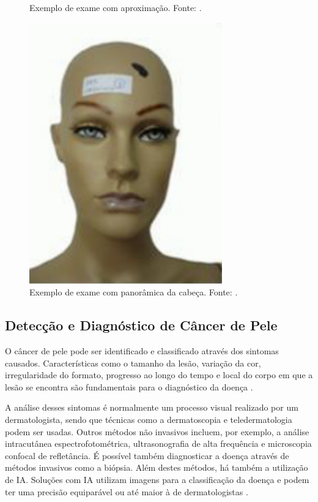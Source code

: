 \begin{figure}[ht]
\begin{minipage}{0.32\textwidth}
            \caption{\small Exemplo de exame com aproximação. Fonte: \textcite{fotos_dermatologia}.}
            \label{fig:approximation_pic}
      \end{minipage}\hfill
      \begin{minipage}{0.32\textwidth}
            \centering
            \includegraphics[height=0.8\columnwidth,keepaspectratio]{images/panoramic.png}
            \caption{\small Exemplo de exame com panorâmica da cabeça. Fonte: \textcite{fotos_dermatologia}.}
            \label{fig:panoramic_pic}
      \end{minipage}
\end{figure}

\subsection{Detecção e Diagnóstico de Câncer de Pele}

O câncer de pele pode ser identificado e classificado através dos sintomas causados. Características como o tamanho da lesão, variação da cor, irregularidade do formato,
progresso ao longo do tempo e local do corpo em que a lesão se encontra são fundamentais para o diagnóstico da doença \cite{recognizing_skin_cancer}.

A análise desses sintomas é normalmente um processo visual realizado por um dermatologista, sendo que técnicas como a dermatoscopia e teledermatologia podem ser usadas.
Outros métodos não invasivos incluem, por exemplo, a análise intracutânea espectrofotométrica, ultrasonografia de alta frequência e microscopia confocal de refletância.
É possível também diagnosticar a doença através de métodos invasivos como a biópsia. Além destes métodos, há também a utilização de \ac{IA}. Soluções com \ac{IA}
utilizam imagens para a classificação da doença e podem ter uma precisão equiparável ou até maior à de dermatologistas \cite{recognizing_skin_cancer, skin_cancer_ai}.

